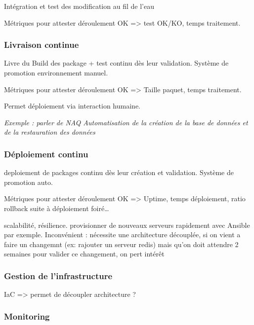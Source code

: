 Intégration et test des modification au fil de l'eau

Métriques pour attester déroulement OK => test OK/KO, temps traitement. 

\subsubsection{Livraison continue}


Livre du Build des package + test continu dès leur validation. Système de promotion environnement manuel.

Métriques pour attester déroulement OK => Taille paquet, temps traitement. 

Permet déploiement via interaction humaine.

\textit{Exemple : parler de NAQ Automatisation de la création de la base de données et de la restauration des données}

\subsubsection{Déploiement continu}


deploiement de packages continu dès leur création et validation. Système de promotion auto.

Métriques pour attester déroulement OK => Uptime, temps déploiement, ratio rollback suite à déploiement foiré\ldots

scalabilité, résilience. provisionner de nouveaux serveurs rapidement avec Ansible par exemple. Inconvénient : nécessite une architecture découplée, si on vient a faire un changemnt (ex: rajouter un serveur redis) mais qu'on doit attendre 2 semaines pour valider ce changement, on pert intérêt

\subsubsection{Gestion de l'infrastructure}


\gls{IaC} => permet de découpler architecture ? %


\subsubsection{Monitoring}

